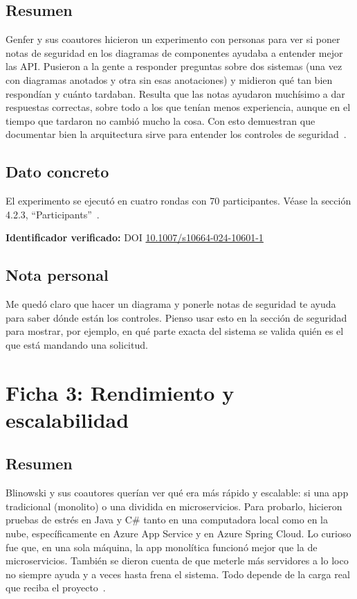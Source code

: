 \documentclass[12pt,a4paper]{article}
\begin{document}
\subsection*{Resumen}

Genfer y sus coautores hicieron un experimento con personas para ver si poner notas de seguridad en los diagramas de componentes ayudaba a entender mejor las API. Pusieron a la gente a responder preguntas sobre dos sistemas (una vez con diagramas anotados y otra sin esas anotaciones) y midieron qué tan bien respondían y cuánto tardaban. Resulta que las notas ayudaron muchísimo a dar respuestas correctas, sobre todo a los que tenían menos experiencia, aunque en el tiempo que tardaron no cambió mucho la cosa. Con esto demuestran que documentar bien la arquitectura sirve para entender los controles de seguridad~\cite{genfer2025}.

\subsection*{Dato concreto}

El experimento se ejecutó en cuatro rondas con 70 participantes. Véase la sección 4.2.3, ``Participants''~\cite{genfer2025}.

\textbf{Identificador verificado:} DOI \href{https://doi.org/10.1007/s10664-024-10601-1}{10.1007/s10664-024-10601-1}

\subsection*{Nota personal}

Me quedó claro que hacer un diagrama y ponerle notas de seguridad te ayuda para saber dónde están los controles. Pienso usar esto en la sección de seguridad para mostrar, por ejemplo, en qué parte exacta del sistema se valida quién es el que está mandando una solicitud.

\section*{Ficha 3: Rendimiento y escalabilidad}

\subsection*{Resumen}

Blinowski y sus coautores querían ver qué era más rápido y escalable: si una app tradicional (monolito) o una dividida en microservicios. Para probarlo, hicieron pruebas de estrés en Java y C\# tanto en una computadora local como en la nube, específicamente en Azure App Service y en Azure Spring Cloud. Lo curioso fue que, en una sola máquina, la app monolítica funcionó mejor que la de microservicios. También se dieron cuenta de que meterle más servidores a lo loco no siempre ayuda y a veces hasta frena el sistema. Todo depende de la carga real que reciba el proyecto~\cite{blinowski2022}.
\end{document}
